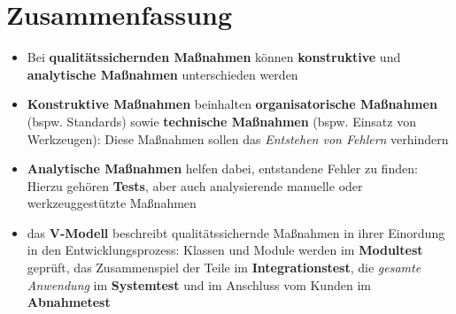 \section{Zusammenfassung}

\begin{itemize}
    \item Bei \textbf{qualitätssichernden Maßnahmen} können \textbf{konstruktive} und \textbf{analytische Maßnahmen} unterschieden werden
    \item \textbf{Konstruktive Maßnahmen} beinhalten \textbf{organisatorische Maßnahmen} (bspw. Standards)
    sowie \textbf{technische Maßnahmen} (bspw. Einsatz von Werkzeugen): Diese Maßnahmen sollen das \textit{Entstehen von Fehlern} verhindern
    \item \textbf{Analytische Maßnahmen} helfen dabei, entstandene Fehler zu finden: Hierzu gehören \textbf{Tests}, aber auch analysierende manuelle oder werkzeuggestützte Maßnahmen
    \item das \textbf{V-Modell} beschreibt qualitätssichernde Maßnahmen in ihrer Einordung in den Entwicklungsprozess: Klassen und Module werden im \textbf{Modultest} geprüft, das Zusammenspiel der Teile im \textbf{Integrationstest}, die \textit{gesamte Anwendung} im \textbf{Systemtest} und im Anschluss vom Kunden im \textbf{Abnahmetest}
\end{itemize}